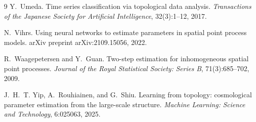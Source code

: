 \documentclass[11pt,a4paper]{article}
\begin{document}
{\begin{thebibliography}{9}
Y.~Umeda.
\newblock Time series classification via topological data analysis.
\newblock \emph{Transactions of the Japanese Society for Artificial
Intelligence}, 32(3):1--12, 2017.

N.~Vihrs.
\newblock Using neural networks to estimate parameters in spatial point process
models.
\newblock arXiv preprint arXiv:2109.15056, 2022.

R.~Waagepetersen and Y.~Guan.
\newblock Two-step estimation for inhomogeneous spatial point processes.
\newblock \emph{Journal of the Royal Statistical Society: Series B},
71(3):685--702, 2009.

J.~H.~T. Yip, A.~Rouhiainen, and G.~Shiu.
\newblock Learning from topology: cosmological parameter estimation from the
large-scale structure.
\newblock \emph{Machine Learning: Science and Technology}, 6:025063, 2025.
\end{thebibliography}
}
\end{document}
